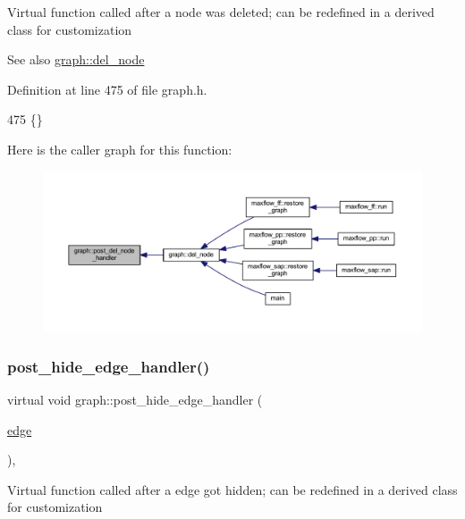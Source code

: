 Virtual function called after a node was deleted; can be redefined in a derived class for customization

\begin{DoxySeeAlso}{See also}
\mbox{\hyperlink{classgraph_a8bdc09d5b9ac4bd26586b054d8fcbe91}{graph\+::del\+\_\+node}} 
\end{DoxySeeAlso}


Definition at line 475 of file graph.\+h.


\begin{DoxyCode}
475 \{\}          
\end{DoxyCode}
Here is the caller graph for this function\+:
\nopagebreak
\begin{figure}[H]
\begin{center}
\leavevmode
\includegraphics[width=350pt]{classgraph_a4e08a559e3f1007a1a16a53c9a15cb0f_icgraph}
\end{center}
\end{figure}
\mbox{\label{classgraph_ad4614e74a125054eb3e180f6f32ab7bb}} 
\subsubsection{\texorpdfstring{post\+\_\+hide\+\_\+edge\+\_\+handler()}{post\_hide\_edge\_handler()}}
{\footnotesize\ttfamily virtual void graph\+::post\+\_\+hide\+\_\+edge\+\_\+handler (\begin{DoxyParamCaption}\item[{\mbox{\hyperlink{classedge}{edge}}}]{ }\end{DoxyParamCaption})\hspace{0.3cm}{\ttfamily [inline]}, {\ttfamily [virtual]}}

Virtual function called after a edge got hidden; can be redefined in a derived class for customization


